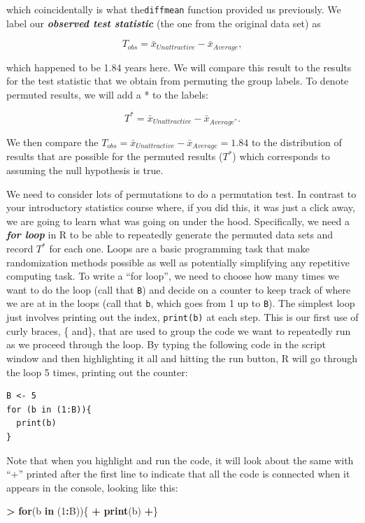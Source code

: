 \documentclass[]{book}
\newenvironment{Shaded}{\begin{snugshade}}{\end{snugshade}}
\newcommand{\KeywordTok}[1]{\textcolor[rgb]{0.13,0.29,0.53}{\textbf{#1}}}
\newcommand{\DecValTok}[1]{\textcolor[rgb]{0.00,0.00,0.81}{#1}}
\newcommand{\StringTok}[1]{\textcolor[rgb]{0.31,0.60,0.02}{#1}}
\newcommand{\ControlFlowTok}[1]{\textcolor[rgb]{0.13,0.29,0.53}{\textbf{#1}}}
\newcommand{\OperatorTok}[1]{\textcolor[rgb]{0.81,0.36,0.00}{\textbf{#1}}}
\newcommand{\NormalTok}[1]{#1}
\theoremstyle{definition}
\theoremstyle{definition}
\theoremstyle{remark}
\begin{document}
which coincidentally is what the\texttt{diffmean} function provided us
previously. We label our \textbf{\emph{observed test statistic}} (the
one from the original data set) as

\[T_{obs}=\bar{x}_{Unattractive}-\bar{x}_{Average},\]

which happened to be 1.84 years here. We will compare this result to the
results for the test statistic that we obtain from permuting the group
labels. To denote permuted results, we will add a * to the labels:

\[T^*=\bar{x}_{Unattractive}-\bar{x}_{Average^*}.\]

We then compare the
\(T_{obs}=\bar{x}_{Unattractive}-\bar{x}_{Average} = 1.84\) to the
distribution of results that are possible for the permuted results
(\(T^*\)) which corresponds to assuming the null hypothesis is true.

We need to consider lots of permutations to do a permutation test. In
contrast to your introductory statistics course where, if you did this,
it was just a click away, we are going to learn what was going on under
the hood. Specifically, we need a \textbf{\emph{for loop}} in R to be
able to repeatedly generate the permuted data sets and record \(T^*\)
for each one. Loops are a basic programming task that make randomization
methods possible as well as potentially simplifying any repetitive
computing task. To write a ``for loop'', we need to choose how many
times we want to do the loop (call that \texttt{B}) and decide on a
counter to keep track of where we are at in the loops (call that
\texttt{b}, which goes from 1 up to \texttt{B}). The simplest loop just
involves printing out the index, \texttt{print(b)} at each step. This is
our first use of curly braces, \{ and\}, that are used to group the code
we want to repeatedly run as we proceed through the loop. By typing the
following code in the script window and then highlighting it all and
hitting the run button, R will go through the loop 5 times, printing out
the counter:

\begin{verbatim}
B <- 5
for (b in (1:B)){
  print(b)
}
\end{verbatim}

Note that when you highlight and run the code, it will look about the
same with ``+'' printed after the first line to indicate that all the
code is connected when it appears in the console, looking like this:

\begin{Shaded}
\begin{Highlighting}[]
\OperatorTok{>}\StringTok{ }\ControlFlowTok{for}\NormalTok{(b }\ControlFlowTok{in}\NormalTok{ (}\DecValTok{1}\OperatorTok{:}\NormalTok{B))\{}
\OperatorTok{+}\StringTok{   }\KeywordTok{print}\NormalTok{(b)}
\OperatorTok{+}\NormalTok{\}}
\end{Highlighting}
\end{Shaded}
\end{document}

